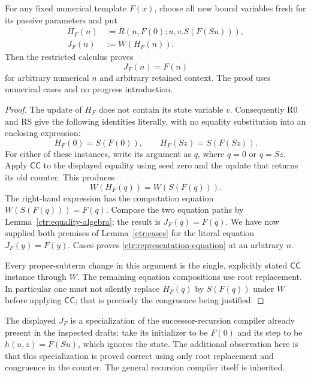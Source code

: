 \begin{lemma}
\label{ctr:context-representation}
For any fixed numerical template $F(x)$, choose all new bound variables
fresh for its passive parameters and put
\[
 \begin{aligned}
  H_F(n)&:=R(n,F(0);u,v.S(F(Su))),\\
  J_F(n)&:=W(H_F(n)).
 \end{aligned}
 \tag{Counter representation}
\]
Then the restricted calculus proves
\[
                         J_F(n)=F(n)
 \tag{Representation}\label{ctr:representation-equation}
\]
for arbitrary numerical $n$ and arbitrary retained context. The proof
uses numerical cases and no progress introduction.
\end{lemma}
\begin{proof}
The update of $H_F$ does not contain its state variable $v$.
Consequently R0 and RS give the following identities literally, with
no equality substitution into an enclosing expression:
\[
 H_F(0)=S(F(0)),\qquad H_F(Sz)=S(F(Sz)).
 \tag{Two computations}
\]
For either of these instances, write its argument as $q$, where $q=0$
or $q=Sz$. Apply $\mathsf{CC}$ to the displayed equality using seed
zero and the update that returns its old counter. This produces
\[
                 W(H_F(q))=W(S(F(q))).
\]
The right-hand expression has the computation equation
$W(S(F(q)))=F(q)$. Compose the two equation paths by
Lemma~\ref{ctr:equality-algebra}; the result is
$J_F(q)=F(q)$. We have now supplied both premises of
Lemma~\ref{ctr:cases} for the literal equation
$J_F(y)=F(y)$. Cases proves
\eqref{ctr:representation-equation} at an arbitrary $n$.

Every proper-subterm change in this argument is the single, explicitly
stated $\mathsf{CC}$ instance through $W$. The remaining equation
compositions use root replacement. In particular one must not silently
replace $H_F(q)$ by $S(F(q))$ under $W$ before applying
$\mathsf{CC}$; that is precisely the congruence being justified.
\end{proof}

The displayed $J_F$ is a specialization of the successor-recursion
compiler already present in the inspected drafts: take its initializer
to be $F(0)$ and its step to be $h(u,z)=F(Su)$, which ignores the state.
The additional observation here is that this specialization is proved
correct using only root replacement and congruence in the counter.
The general recursion compiler itself is inherited.

